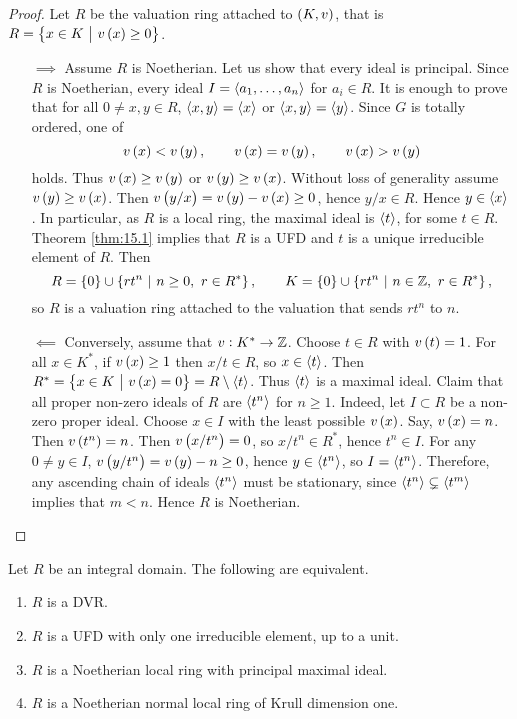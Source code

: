 \begin{proof}
Let $ R $ be the valuation ring attached to $ \br{K, v} $, that is $ R = \cbr{x \in K \st v\br{x} \ge 0} $.
\begin{itemize}
\item[$ \implies $] Assume $ R $ is Noetherian. Let us show that every ideal is principal. Since $ R $ is Noetherian, every ideal $ I = \left\langle a_1, \dots, a_n \right\rangle $ for $ a_i \in R $. It is enough to prove that for all $ 0 \ne x, y \in R $, $ \left\langle x, y \right\rangle = \left\langle x \right\rangle $ or $ \left\langle x, y \right\rangle = \left\langle y \right\rangle $. Since $ G $ is totally ordered, one of
$$ v\br{x} < v\br{y}, \qquad v\br{x} = v\br{y}, \qquad v\br{x} > v\br{y} $$
holds. Thus $ v\br{x} \ge v\br{y} $ or $ v\br{y} \ge v\br{x} $. Without loss of generality assume $ v\br{y} \ge v\br{x} $. Then $ v\br{y / x} = v\br{y} - v\br{x} \ge 0 $, hence $ y / x \in R $. Hence $ y \in \left\langle x \right\rangle $. In particular, as $ R $ is a local ring, the maximal ideal is $ \left\langle t \right\rangle $, for some $ t \in R $. Theorem \ref{thm:15.1} implies that $ R $ is a UFD and $ t $ is a unique irreducible element of $ R $. Then
$$ R = \cbr{0} \cup \cbr{rt^n \st n \ge 0, \ r \in R^*}, \qquad K = \cbr{0} \cup \cbr{rt^n \st n \in \ZZ, \ r \in R^*}, $$
so $ R $ is a valuation ring attached to the valuation that sends $ rt^n $ to $ n $.
\item[$ \impliedby $] Conversely, assume that $ v : K^* \to \mathbb{Z} $. Choose $ t \in R $ with $ v\br{t} = 1 $. For all $ x \in K^* $, if $ v\br{x} \ge 1 $ then $ x / t \in R $, so $ x \in \left\langle t \right\rangle $. Then $ R^* = \cbr{x \in K \st v\br{x} = 0} = R \setminus \abr{t} $. Thus $ \left\langle t \right\rangle $ is a maximal ideal. Claim that all proper non-zero ideals of $ R $ are $ \left\langle t^n \right\rangle $ for $ n \ge 1 $. Indeed, let $ I \subset R $ be a non-zero proper ideal. Choose $ x \in I $ with the least possible $ v\br{x} $. Say, $ v\br{x} = n $. Then $ v\br{t^n} = n $. Then $ v\br{x / t^n} = 0 $, so $ x / t^n \in R^* $, hence $ t^n \in I $. For any $ 0 \ne y \in I $, $ v\br{y / t^n} = v\br{y} - n \ge 0 $, hence $ y \in \left\langle t^n \right\rangle $, so $ I = \left\langle t^n \right\rangle $. Therefore, any ascending chain of ideals $ \left\langle t^n \right\rangle $ must be stationary, since $ \left\langle t^n \right\rangle \subsetneq \left\langle t^m \right\rangle $ implies that $ m < n $. Hence $ R $ is Noetherian.
\end{itemize}
\end{proof}

\pagebreak

\begin{theorem}
\label{thm:15.5}
Let $ R $ be an integral domain. The following are equivalent.
\begin{enumerate}
\item $ R $ is a DVR.
\item $ R $ is a UFD with only one irreducible element, up to a unit.
\item $ R $ is a Noetherian local ring with principal maximal ideal.
\item $ R $ is a Noetherian normal local ring of Krull dimension one.
\end{enumerate}
\end{theorem}

